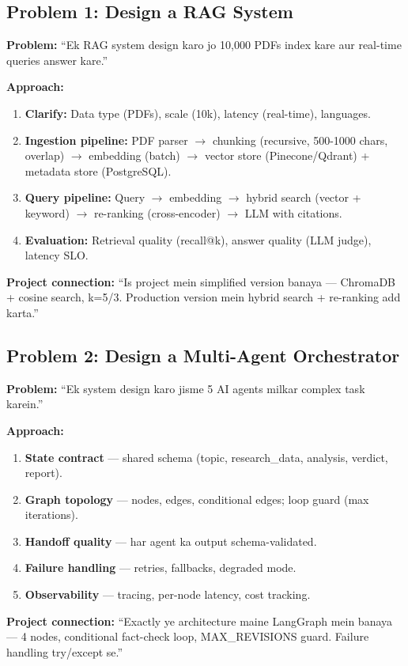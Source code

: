 \subsection{Problem 1: Design a RAG System}

\begin{interviewbox}
\textbf{Problem:} ``Ek RAG system design karo jo 10,000 PDFs index kare aur real-time queries answer kare.''

\textbf{Approach:}
\begin{enumerate}[label=\arabic*.]
\item \textbf{Clarify:} Data type (PDFs), scale (10k), latency (real-time), languages.
\item \textbf{Ingestion pipeline:} PDF parser $\rightarrow$ chunking (recursive, 500-1000 chars, overlap) $\rightarrow$ embedding (batch) $\rightarrow$ vector store (Pinecone/Qdrant) + metadata store (PostgreSQL).
\item \textbf{Query pipeline:} Query $\rightarrow$ embedding $\rightarrow$ hybrid search (vector + keyword) $\rightarrow$ re-ranking (cross-encoder) $\rightarrow$ LLM with citations.
\item \textbf{Evaluation:} Retrieval quality (recall@k), answer quality (LLM judge), latency SLO.
\end{enumerate}

\textbf{Project connection:} ``Is project mein simplified version banaya --- ChromaDB + cosine search, k=5/3. Production version mein hybrid search + re-ranking add karta.''
\end{interviewbox}

\subsection{Problem 2: Design a Multi-Agent Orchestrator}

\begin{interviewbox}
\textbf{Problem:} ``Ek system design karo jisme 5 AI agents milkar complex task karein.''

\textbf{Approach:}
\begin{enumerate}[label=\arabic*.]
\item \textbf{State contract} --- shared schema (topic, research\_data, analysis, verdict, report).
\item \textbf{Graph topology} --- nodes, edges, conditional edges; loop guard (max iterations).
\item \textbf{Handoff quality} --- har agent ka output schema-validated.
\item \textbf{Failure handling} --- retries, fallbacks, degraded mode.
\item \textbf{Observability} --- tracing, per-node latency, cost tracking.
\end{enumerate}

\textbf{Project connection:} ``Exactly ye architecture maine LangGraph mein banaya --- 4 nodes, conditional fact-check loop, MAX\_REVISIONS guard. Failure handling try/except se.''
\end{interviewbox}

